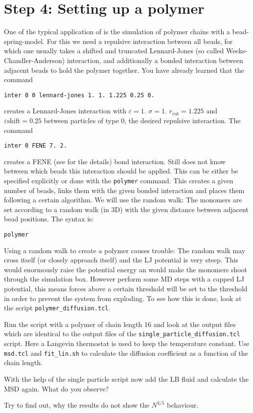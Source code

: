 \section{Step 4: Setting up a polymer}
One of the typical application of \ES{} is the simulation of polymer chains 
with a bead-spring-model. For this we need a repulsive interaction
between all beads, for which one usually takes a shifted and truncated
Lennard-Jones (so called Weeks-Chandler-Anderson) interaction, 
and additionally a bonded interaction between 
adjacent beads to hold the polymer together. You have already learned
that the command
{\vspace{0,2cm}\small
\begin{lstlisting}[numbers=none]
inter 0 0 lennard-jones 1. 1. 1.225 0.25 0. 
\end{lstlisting}\vspace{0,2cm}
}
creates a Lennard-Jones interaction with $\varepsilon=1.$ $\sigma=1.$
$r_\text{cut} = 1.225$ and $\varepsilon\text{shift}=0.25$ between particles
of type 0, the desired 
repulsive interaction. The command
{\vspace{0,2cm}\small
\begin{lstlisting}[numbers=none]
inter 0 FENE 7. 2. 
\end{lstlisting}\vspace{0,2cm}
}
creates a FENE (see \ES{} for the details) bond interaction. Still \ES{}
does not know between which beads this interaction should be applied.
This can be either be specified explicitly or done with the \lstinline|polymer|
command. This creates a given number of beads, links them with the given
bonded interaction and places them following a certain algorithm. We will
use the random walk: The monomers are set according to a random walk (in 3D)
with the given distance between adjacent bead positions. The syntax is:
{\vspace{0,2cm}\small
\begin{lstlisting}[numbers=none]
polymer 
\end{lstlisting}\vspace{0,2cm}
}
Using a random walk to create a polymer causes trouble: The random walk may 
cross itself (or closely approach itself) and the LJ potential is very
steep. This would enormously raise the potential energy an would make
the monomers shoot through the simulation box. 
However perform some MD steps with a capped LJ potential, this means 
forces above a certain threshold will be set to the threshold in order to prevent
the system from exploding. To see how this is done, look at the script 
\lstinline|polymer_diffusion.tcl|.

Run the script with a polymer of chain length 16 and look at the output files
which are identical to the output files of the \lstinline|single_particle_diffusion.tcl|
script. Here a Langevin thermostat is used to keep the temperature constant.
Use \lstinline|msd.tcl| and \lstinline|fit_lin.sh| to calculate the diffusion
coefficient as a function of the chain length.


With the help of the single particle script now add the LB fluid and calculate
the MSD again. What do you observe?

Try to find out, why the results do not show the $N^{3/5}$ behaviour.
